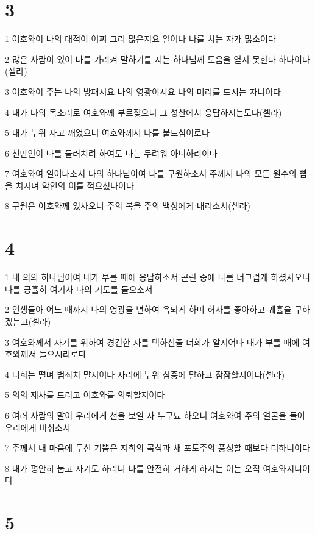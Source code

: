 \chapter{3}

\par 1 여호와여 나의 대적이 어찌 그리 많은지요 일어나 나를 치는 자가 많소이다
\par 2 많은 사람이 있어 나를 가리켜 말하기를 저는 하나님께 도움을 얻지 못한다 하나이다 (셀라)
\par 3 여호와여 주는 나의 방패시요 나의 영광이시요 나의 머리를 드시는 자니이다
\par 4 내가 나의 목소리로 여호와께 부르짖으니 그 성산에서 응답하시는도다(셀라)
\par 5 내가 누워 자고 깨었으니 여호와께서 나를 붙드심이로다
\par 6 천만인이 나를 둘러치려 하여도 나는 두려워 아니하리이다
\par 7 여호와여 일어나소서 나의 하나님이여 나를 구원하소서 주께서 나의 모든 원수의 뺨을 치시며 악인의 이를 꺽으셨나이다
\par 8 구원은 여호와께 있사오니 주의 복을 주의 백성에게 내리소서(셀라)

\chapter{4}

\par 1 내 의의 하나님이여 내가 부를 때에 응답하소서 곤란 중에 나를 너그럽게 하셨사오니 나를 긍휼히 여기사 나의 기도를 들으소서
\par 2 인생들아 어느 때까지 나의 영광을 변하여 욕되게 하며 허사를 좋아하고 궤휼을 구하겠는고(셀라)
\par 3 여호와께서 자기를 위하여 경건한 자를 택하신줄 너희가 알지어다 내가 부를 때에 여호와께서 들으시리로다
\par 4 너희는 떨며 범죄치 말지어다 자리에 누워 심중에 말하고 잠잠할지어다(셀라)
\par 5 의의 제사를 드리고 여호와를 의뢰할지어다
\par 6 여러 사람의 말이 우리에게 선을 보일 자 누구뇨 하오니 여호와여 주의 얼굴을 들어 우리에게 비취소서
\par 7 주께서 내 마음에 두신 기쁨은 저희의 곡식과 새 포도주의 풍성할 때보다 더하니이다
\par 8 내가 평안히 눕고 자기도 하리니 나를 안전히 거하게 하시는 이는 오직 여호와시니이다

\chapter{5}

